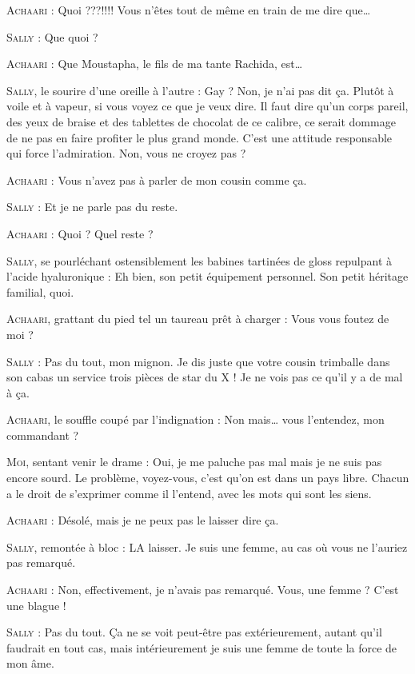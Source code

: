 \begin{dialogue}
\textsc{Achaari} : Quoi ???!!!! Vous n’êtes tout de même en train de me dire que…

\textsc{Sally} : Que quoi ?

\textsc{Achaari} : Que Moustapha, le fils de ma tante Rachida, est…

\textsc{Sally}, le sourire d’une oreille à l’autre : Gay ? Non, je n’ai pas dit ça. Plutôt à voile et à vapeur, si vous voyez ce que je veux dire. Il faut dire qu’un corps pareil, des yeux de braise et des tablettes de chocolat de ce calibre, ce serait dommage de ne pas en faire profiter le plus grand monde. C’est une attitude responsable qui force l’admiration. Non, vous ne croyez pas ?

\textsc{Achaari} : Vous n’avez pas à parler de mon cousin comme ça.

\textsc{Sally} : Et je ne parle pas du reste.

\textsc{Achaari} : Quoi ? Quel reste ?

\textsc{Sally}, se pourléchant ostensiblement les babines tartinées de gloss repulpant à l’acide hyaluronique : Eh bien, son petit équipement personnel. Son petit héritage familial, quoi.

\textsc{Achaari}, grattant du pied tel un taureau prêt à charger : Vous vous foutez de moi ?

\textsc{Sally} : Pas du tout, mon mignon. Je dis juste que votre cousin trimballe dans son cabas un service trois pièces de star du X ! Je ne vois pas ce qu’il y a de mal à ça.

\textsc{Achaari}, le souffle coupé par l’indignation : Non mais… vous l’entendez, mon commandant ?

\textsc{Moi}, sentant venir le drame : Oui, je me paluche pas mal mais je ne suis pas encore sourd. Le problème, voyez-vous, c’est qu’on est dans un pays libre. Chacun a le droit de s’exprimer comme il l’entend, avec les mots qui sont les siens.

\textsc{Achaari} : Désolé, mais je ne peux pas le laisser dire ça.

\textsc{Sally}, remontée à bloc : LA laisser. Je suis une femme, au cas où vous ne l’auriez pas remarqué.

\textsc{Achaari} : Non, effectivement, je n’avais pas remarqué. Vous, une femme ? C’est une blague !

\textsc{Sally} : Pas du tout. Ça ne se voit peut-être pas extérieurement, autant qu’il faudrait en tout cas, mais intérieurement je suis une femme de toute la force de mon âme.


\end{dialogue}
